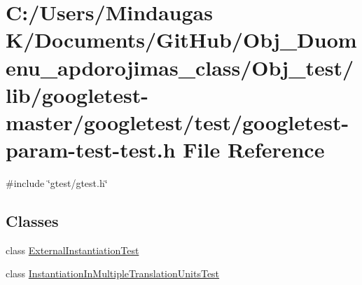 \hypertarget{_obj__test_2lib_2googletest-master_2googletest_2test_2googletest-param-test-test_8h}{}\section{C\+:/\+Users/\+Mindaugas K/\+Documents/\+Git\+Hub/\+Obj\+\_\+\+Duomenu\+\_\+apdorojimas\+\_\+class/\+Obj\+\_\+test/lib/googletest-\/master/googletest/test/googletest-\/param-\/test-\/test.h File Reference}
\label{_obj__test_2lib_2googletest-master_2googletest_2test_2googletest-param-test-test_8h}
{\ttfamily \#include \char`\"{}gtest/gtest.\+h\char`\"{}}\newline
\subsection*{Classes}
\begin{DoxyCompactItemize}
\item 
class \mbox{\hyperlink{class_external_instantiation_test}{External\+Instantiation\+Test}}
\item 
class \mbox{\hyperlink{class_instantiation_in_multiple_translation_units_test}{Instantiation\+In\+Multiple\+Translation\+Units\+Test}}
\end{DoxyCompactItemize}
